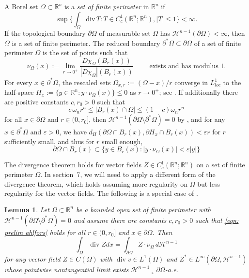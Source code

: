 \documentclass[10pt,a4paper]{amsart}
\numberwithin{equation}{section}
\newtheorem{lemma}[theorem]{Lemma}
\def\R{{\mathbb R}}
\def\e{\varepsilon}
\def\W{\Omega}
\def\om{\omega}
\providecommand{\href}[2]{#2}
\begin{document}
A Borel set $\W\subset \R^n$ is a {\it set of finite perimeter} in $\R^n$ if 
\[\sup\Big\{ \int_\W \text{div}\,  T  : T\in C^1_c(\R^n; \R^n) , |T|\leq 1\Big\}<\infty.\]
If the topological boundary $\partial \W$ of measurable set $\W$ has  $\mathcal{H}^{n-1}(\partial \Omega) <\infty$, then $\W$ is a set of finite perimeter.
The reduced boundary $\partial^*\W \subset \partial \W$ of a set of finite perimeter $\W$ is the set of points such that 
\[
\nu_\W(x) := \lim_{r\to 0^+} \frac{D\chi_\W(B_r(x))}{|D\chi_\W| (B_r(x))} \qquad \text{ exists and has modulus }1.
\]
For every $x\in \partial^*\W$, the rescaled sets $\W_{x,r}:=(\W-x)/r$ converge in $L^1_{loc}$ to the half-space $H_x:= \{y \in \R^n : y \cdot \nu_\W(x)\} \leq 0$ as $r \to 0^+$; see \cite[Theorem 15.5]{MaggiBook}.
 If additionally there are positive constants $c, r_0>0$ such that
\[
  c\, \om_nr^n  \leq |B_r(x) \cap \W| \leq (1-c)\om_n r^n
\]
  for all $x \in \partial \W$ and $r\in (0,r_0]$, then $\mathcal{H}^{n-1}(\partial \W \setminus \partial^*\W) =0$ by \cite[Theorem 16.2]{MaggiBook}, and for any $x \in \partial^*\W$ and $\e>0$, we have $d_H(\partial \W \cap B_r(x) , \partial H_{x} \cap B_r(x)) < \e r$ for $r$ sufficiently small, and thus for $r$ small enough,
\begin{equation}\label{eqn: cone}
    \partial\W \cap B_r(x)\subset \{ y \in B_r(x): |y\cdot \nu_\W(x)| <\e|y|\} 
\end{equation}

The divergence theorem holds for vector fields $Z \in C^1_c(\R^n ; \R^n)$ on a set of finite perimeter $\W$. In section~\href{https://arxiv.org/abs/2504.13053v2}{7}, we will need to apply a different form of the divergence theorem, which holds assuming more regularity on $\W$ but less regularity for the vector fields. The following is a special case of \cite[Theorem 2.3.1]{HMT}. 
\begin{lemma}\label{l:fancy div thm}
Let $\Omega \subset \mathbb{R}^{n}$ be a bounded open set of finite perimeter with $\mathcal{H}^{n-1}(\partial \W \setminus \partial^*\W)=0$ and assume there are constants $c, r_0>0 $ such that
\eqref{eqn: prelim ahlfors} holds
for all  $r \in (0,r_0]$ and $x \in \partial \W$.
Then
\[
\int_{\Omega} \operatorname{div} Z d x =\int_{\partial \Omega} Z \cdot \nu_\W \,  d\mathcal{H}^{n-1}
\]
for any vector field $Z \in C(\Omega)$ with $\operatorname{div} v \in L^1(\Omega)$ and $Z^* \in L^\infty( \partial \W, \mathcal{H}^{n-1})$ whose pointwise nontangential limit exists $\mathcal{H}^{n-1}\llcorner \partial \W$-a.e.
\end{lemma}
%
%
%
\end{document}

